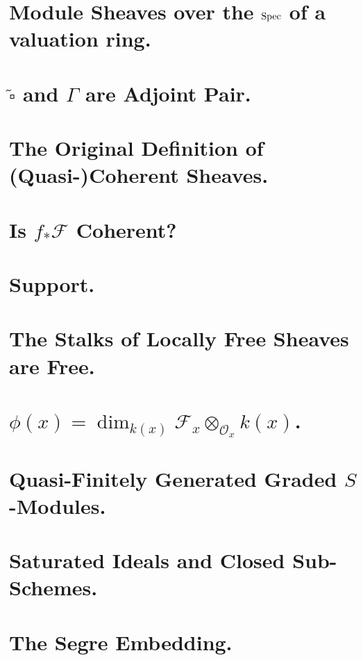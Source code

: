 \documentclass[a4paper]{jsarticle}
\newcommand{\shF}{\mathcal{F}}
\newcommand{\shO}{\mathcal{O}}
\begin{document}
\section{Module Sheaves over the $\operatorname{Spec}$ of a valuation ring.} %

\section{$\tilde{\square}$ and $\Gamma$ are Adjoint Pair.} %

\section{The Original Definition of (Quasi-)Coherent Sheaves.} %

\section{Is $f_* \shF$ Coherent?} %

\section{Support.} %

\section{The Stalks of Locally Free Sheaves are Free.} %

\section{$\phi(x)=\dim_{k(x)} \shF_x \otimes_{\shO_x} k(x)$.} %

\section{Quasi-Finitely Generated Graded $S$-Modules.} %

\section{Saturated Ideals and Closed Sub-Schemes.} %

\section{The Segre Embedding.} %
\end{document}
